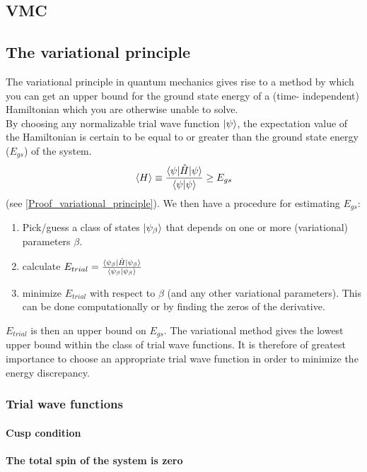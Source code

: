 \documentclass[10pt,a4paper]{article}
\begin{document}
\subsection{VMC}
\subsection{The variational principle}
The variational principle in quantum mechanics gives rise to a method by which you can get an upper bound for the ground state energy of a (time- independent) Hamiltonian which you are otherwise unable to solve.\\ 
By choosing any normalizable trial wave function $\ket{\psi}$, the expectation value of the Hamiltonian is certain to be equal to or greater than the ground state energy ($E_{gs}$) of the system.
$$
\braket{H}\equiv \frac{\braket{\psi|\hat{H}|\psi}}{\braket{\psi|\psi}} \geq E_{gs}
$$
(see \ref{Proof_variational_principle}). We then have a procedure for estimating $E_{gs}$:
\begin{enumerate}
\item Pick/guess a class of states $\ket{\psi_\beta}$ that depends on one or more (variational) parameters $\beta$.
\item calculate $E_{trial}=\frac{\braket{\psi_\beta|\hat{H}|\psi_\beta}}{\braket{\psi_\beta|\psi_\beta}}$
\item minimize $E_{trial}$ with respect to $\beta$ (and any other variational parameters). This can be done computationally or by finding the zeros of the derivative.
\end{enumerate}
$E_{trial}$ is then an upper bound on $E_{gs}$. The variational method gives the lowest upper bound within the class of trial wave functions. It is therefore of greatest importance to choose an appropriate trial wave function in order to minimize the energy discrepancy.
\subsubsection{Trial wave functions}
\paragraph{Cusp condition}
\paragraph{The total spin of the system is zero}
\end{document}
